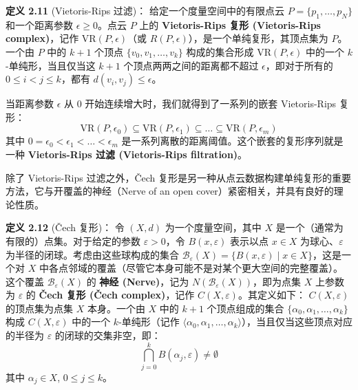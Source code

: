 \textbf{定义 2.11} (Vietoris-Rips 过滤)\cite{zomorodian2004computing}：
给定一个度量空间中的有限点云 $P = \{p_1, \ldots, p_N\}$ 和一个距离参数 $\epsilon \ge 0$。点云 $P$ 上的 \textbf{Vietoris-Rips 复形 (Vietoris-Rips complex)}，记作 $\text{VR}(P, \epsilon)$（或 $R(P, \epsilon)$），是一个单纯复形，其顶点集为 $P$。一个由 $P$ 中的 $k+1$ 个顶点 $\{v_0, v_1, \ldots, v_k\}$ 构成的集合形成 $\text{VR}(P, \epsilon)$ 中的一个 $k$-单纯形，当且仅当这 $k+1$ 个顶点两两之间的距离都不超过 $\epsilon$，即对于所有的 $0 \le i < j \le k$，都有 $d(v_i, v_j) \le \epsilon$。

当距离参数 $\epsilon$ 从 $0$ 开始连续增大时，我们就得到了一系列的嵌套 Vietoris-Rips 复形：
$$ \text{VR}(P, \epsilon_0) \subseteq \text{VR}(P, \epsilon_1) \subseteq \dots \subseteq \text{VR}(P, \epsilon_m) $$
其中 $0 = \epsilon_0 < \epsilon_1 < \dots < \epsilon_m$ 是一系列离散的距离阈值。这个嵌套的复形序列就是一种 \textbf{Vietoris-Rips 过滤 (Vietoris-Rips filtration)}。

除了 Vietoris-Rips 过滤之外，Čech 复形是另一种从点云数据构建单纯复形的重要方法，它与开覆盖的神经（Nerve of an open cover）紧密相关，并具有良好的理论性质。

\textbf{定义 2.12} (Čech 复形)\cite{zomorodian2004computing}：
令 $(X, d)$ 为一个度量空间，其中 $X$ 是一个（通常为有限的）点集。对于给定的参数 $\varepsilon > 0$，令 $B(x, \varepsilon)$ 表示以点 $x \in X$ 为球心、$\varepsilon$ 为半径的闭球。考虑由这些球构成的集合 $\mathcal{B}_{\varepsilon}(X) = \{B(x, \varepsilon) \mid x \in X\}$，这是一个对 $X$ 中各点邻域的覆盖（尽管它本身可能不是对某个更大空间的完整覆盖）。
这个覆盖 $\mathcal{B}_{\varepsilon}(X)$ 的 \textbf{神经 (Nerve)}，记为 $N(\mathcal{B}_{\varepsilon}(X))$，即为点集 $X$ 上参数为 $\varepsilon$ 的 \textbf{Čech 复形 (Čech complex)}，记作 $C(X, \varepsilon)$。其定义如下：
$C(X, \varepsilon)$ 的顶点集为点集 $X$ 本身。一个由 $X$ 中的 $k+1$ 个顶点组成的集合 $\{\alpha_0, \alpha_1, \ldots, \alpha_k\}$ 构成 $C(X, \varepsilon)$ 中的一个 $k$-单纯形（记作 $\langle \alpha_0, \alpha_1, \ldots, \alpha_k \rangle$），当且仅当这些顶点对应的半径为 $\varepsilon$ 的闭球的交集非空，即：
$$ \bigcap_{j=0}^{k} B(\alpha_j, \varepsilon) \neq \emptyset $$
其中 $\alpha_j \in X$, $0 \le j \le k$。

